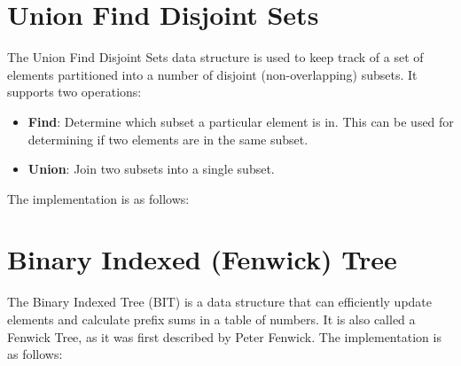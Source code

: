 \section{Union Find Disjoint Sets}

The Union Find Disjoint Sets data structure is used to keep track of a set of elements partitioned into a number of disjoint (non-overlapping) subsets. It supports two operations:

\begin{itemize}
\item \textbf{Find}: Determine which subset a particular element is in. This can be used for determining if two elements are in the same subset.
\item \textbf{Union}: Join two subsets into a single subset.
\end{itemize}

The implementation is as follows:



\section{Binary Indexed (Fenwick) Tree}

The Binary Indexed Tree (BIT) is a data structure that can efficiently update elements and calculate prefix sums in a table of numbers. It is also called a Fenwick Tree, as it was first described by Peter Fenwick. The implementation is as follows:

